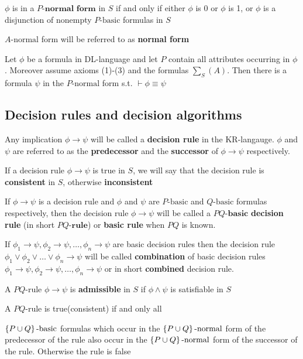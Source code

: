 \documentclass[11pt]{article}
\begin{document}
\(\phi\) is in a \(P\textbf{-normal form}\) in \(S\) if and only if either \(\phi\) is 0 or \(\phi\)
is 1, or \(\phi\) is a disjunction of nonempty \(P\text{-basic}\) formulas in \(S\)

\(A\text{-normal}\) form will be referred to as \textbf{normal form}

\begin{proposition}[7.4]
Let \(\phi\) be a formula in DL-language and let \(P\) contain all attributes
occurring in \(\phi\). Moreover assume axioms (1)-(3) and the formulas \(\sum_S(A)\).
Then there is a formula \(\psi\) in the \(P\text{-normal}\) form s.t. \(\vdash\phi\equiv\psi\)
\end{proposition}
\subsection{Decision rules and decision algorithms}
\label{sec:org531d2a2}
Any implication \(\phi\to\psi\) will be called a \textbf{decision rule} in the KR-langauge. \(\phi\)
and \(\psi\) are referred to as the \textbf{predecessor} and the \textbf{successor} of \(\phi\to\psi\)
respectively. 

If a decision rule \(\phi\to\psi\) is true in \(S\), we will say that the decision rule
is \textbf{consistent} in \(S\), otherwise \textbf{inconsistent}

If \(\phi\to\psi\) is a decision rule and \(\phi\) and \(\psi\) are \(P\text{-basic}\) and
\(Q\text{-basic}\) formulas respectively, then the decision rule \(\phi\to\psi\) will
be called a \(PQ\textbf{-basic}\) \textbf{decision rule} (in short \(PQ\textbf{-rule}\))
or \textbf{basic rule} when \(PQ\) is
known.

If \(\phi_1 \to \psi,\phi_2 \to\psi,\dots,\phi_n \to\psi\) are basic decision rules
then the decision rule \(\phi_1 \vee\phi_2 \vee\dots\vee\phi_n \to\psi\) will be
called \textbf{combination} of basic decision rules
\(\phi_1 \to \psi,\phi_2 \to\psi,\dots,\phi_n \to\psi\) 
or in short  \textbf{combined} decision rule.

A \(PQ\text{-rule}\) \(\phi\to\psi\) is \textbf{admissible} in \(S\) if \(\phi\wedge\psi\) is satisfiable in \(S\)

\begin{proposition}[7.5]
A \(PQ\text{-rule}\) is true(consistent) if and only all \linebreak 

\(\left\{ P\cup Q\right\}\text{-basic}\) formulas which occur in the 
\(\left\{ P\cup Q\right\}\text{-normal}\)
form of the predecessor of the rule also occur in the 
\(\left\{ P\cup Q\right\}\text{-normal}\) form of the successor of the rule. Otherwise the
rule is false 
\end{proposition}
\end{document}
